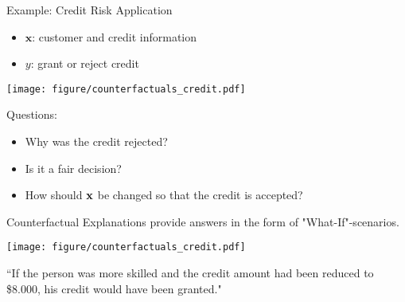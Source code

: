 \documentclass[11pt,compress,t,notes=noshow, aspectratio=169, xcolor=table]{beamer}
\begin{document}
\begin{vbframe}[allowframebreaks]{Example: Credit Risk Application} 
	\begin{itemize}
		\item $\textbf{x}$: customer and credit information
		\item $y$: grant or reject credit
	\end{itemize}
	\begin{center}\texttt{[image: figure/counterfactuals\_credit.pdf]} \end{center}
	
	Questions: 
	\begin{itemize}
		\item Why was the credit rejected? 
		\item Is it a fair decision? 
		\item How should $\mathbf{x}$ be changed so that the credit is accepted?  
	\end{itemize}
	
	\framebreak
	Counterfactual Explanations provide answers in the form of "What-If"-scenarios. 
	\begin{center}\texttt{[image: figure/counterfactuals\_credit.pdf]} \end{center}
	
	``If the person was more skilled and the credit amount had been reduced to \$8.000, his credit would have been granted."  \\[0.2cm]
	
	
\end{vbframe}
\end{document}
